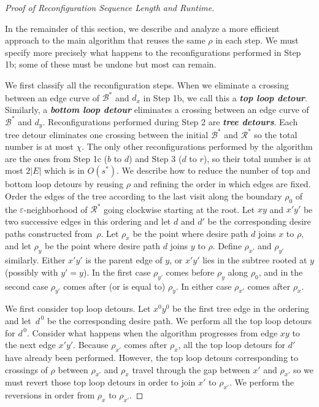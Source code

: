 \documentclass[a4paper,USenglish,cleveref,colorlinks=true,urlcolor=black,linkcolor=black,citecolor=black,thm-restate,authorcolumns]{lipics-v2021}
\theoremstyle{claimstyle}
\def\defn#1{\textit{\textbf{\boldmath #1}}}
\begin{document}

\reconfigurationtwoplaneembeddingstree*

\begin{proof}[Proof of Reconfiguration Sequence Length and Runtime]
    \label{Preconfigurationtwoplaneembeddingstree}

    In the remainder of this section, we describe and analyze a more efficient approach to the main algorithm that reuses the same $\rho$ in each step.
    We must specify more precisely what happens to the reconfigurations performed in Step 1b; some of these must be undone but most can remain.

    We first classify all the reconfiguration steps.
    When we eliminate a crossing between an edge curve of $\mathcal B^*$ and $d_x$ in Step 1b, we call this a \defn{top loop detour}.
    Similarly, a \defn{bottom loop detour} eliminates a crossing between an edge curve of $\mathcal B^*$ and $d_y$.
    Reconfigurations performed during Step 2 are \defn{tree detours}.
    Each tree detour eliminates one crossing between the initial $\mathcal{B}^*$ and ${\mathcal R}^*$ so the total number is at most $\chi$.
    The only other reconfigurations performed by the algorithm are the ones from Step 1c ($b$ to $d$) and Step 3 ($d$ to $r$), so their total number is at most $2|E|$ which is in $O(s^*)$.
    We describe how to reduce the number of top and bottom loop detours by reusing $\rho$ and refining the order in which edges are fixed.
    Order the edges of the tree according to the last visit along the boundary $\rho_0$ of the $\varepsilon$-neighborhood of ${\mathcal R}^*$ going clockwise starting at the root.  Let $xy$ and $x' y'$ be two successive edges in this ordering and let $d$ and $d'$ be the corresponding desire paths constructed from~$\rho$.
    Let $\rho_x$ be the point where desire path $d$ joins $x$ to $\rho$, and let $\rho_y$ be the point where desire path $d$ joins $y$ to $\rho$.
    Define $\rho_{x'}$ and $\rho_{y'}$ similarly.
    Either $x' y'$ is the parent edge of $y$, or $x'y'$ lies in the subtree rooted at $y$ (possibly with $y'=y$).
    In the first case $\rho_{y'}$ comes before $\rho_y$ along $\rho_0$, and in the second case $\rho_{y'}$ comes after (or is equal to) $\rho_y$.
    In either case $\rho_{x'}$ comes after $\rho_x$.

    We first consider top loop detours.
    Let $x^0 y^0$ be the first tree edge in the ordering and let~$d^{\,0}$ be the corresponding desire path.
    We perform all the top loop detours for $d^{\,0}$.
    Consider what happens when the algorithm progresses from edge $xy$ to the next edge $x' y'$.
    Because  $\rho_{x'}$ comes after $\rho_x$, all the top loop detours for $d'$ have already been performed.
    However, the top loop detours corresponding to crossings of $\rho$ between $\rho_{x'}$ and $\rho_{x}$ travel through the gap between $x'$ and $\rho_{x'}$ so we must revert those top loop detours in order to join $x'$ to $\rho_{x'}$.
    We perform the reversions in order from $\rho_{x}$ to $\rho_{x'}$.


\end{proof}
\end{document}
